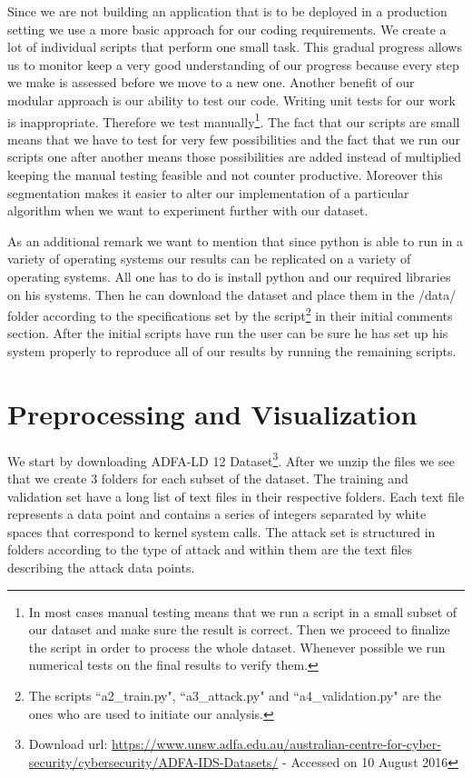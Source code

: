 \documentclass[reqno,openany,12pt]{amsbook}
\begin{document}
Since we are not building an application that is to be deployed in a production setting we use a more basic approach for our coding requirements. We create a lot of individual scripts that perform one small task. This gradual progress allows us to monitor keep a very good understanding of our progress because every step we make is assessed before we move to a new one. Another benefit of our modular approach is our ability to test our code. Writing unit tests for our work is inappropriate. Therefore we test manually\footnote{In most cases manual testing means that we run a script in a small subset of our dataset and make sure the result is correct. Then we proceed to finalize the script in order to process the whole dataset. Whenever possible we run numerical tests on the final results to verify them.}. The fact that our scripts are small means that we have to test for very few possibilities and the fact that we run our scripts one after another means those possibilities are added instead of multiplied keeping the manual testing feasible and not counter productive. Moreover this segmentation makes it easier to alter our implementation of a particular algorithm when we want to experiment further with our dataset.

As an additional remark we want to mention that  since python is able to run in a variety of operating systems our results can be replicated on a variety of operating systems. All one has to do is install python and our required libraries on his systems. Then he can download the dataset and place them in the /data/ folder according to the specifications set by the script\footnote{The scripts ``a2\_{}train.py", ``a3\_{}attack.py" and ``a4\_{}validation.py" are the ones who are used to initiate our analysis.} in their initial comments section. After the initial scripts have run the user can be sure he has set up his system properly to reproduce all of our results by running the remaining scripts.

\section{Preprocessing and Visualization}

We start by downloading ADFA-LD 12 Dataset\footnote{Download url: \url{https://www.unsw.adfa.edu.au/australian-centre-for-cyber-security/cybersecurity/ADFA-IDS-Datasets/} - Accessed on 10 August 2016}.
After we unzip the files we see that we create 3 folders for each subset of the dataset. The training and validation set have a long list of text files in their respective folders. Each text file represents a data point and contains a series of integers separated by white spaces that correspond to kernel system calls. The attack set is structured in folders according to the type of attack and within them are the text files describing the attack data points.
\end{document}
